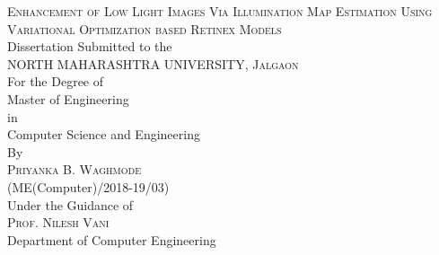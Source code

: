 \begin{titlepage}

\newcommand{\HRule}{\rule{\linewidth}{0.5mm}} %

\center %


\textsc{\normalsize Enhancement of Low Light Images Via Illumination Map Estimation Using Variational Optimization based Retinex Models}\\[1.5cm] %
\normalsize Dissertation Submitted to the\\[0.5cm] %
\textsc{\normalsize NORTH MAHARASHTRA UNIVERSITY, Jalgaon}\\[0.5cm] %
\normalsize For the Degree of\\[0.25cm]
\normalsize Master of Engineering\\[0.5cm]
\normalsize in\\[0.5cm]
\normalsize Computer Science and Engineering\\[0.5cm]
\normalsize By\\[0.5cm]
\textsc{\normalsize Priyanka B. Waghmode}\\[0.25cm]
\normalsize (ME(Computer)/2018-19/03)\\[0.5cm]
\normalsize Under the Guidance of\\
\textsc{\normalsize Prof. Nilesh Vani }\\
\normalsize Department of Computer Engineering






\end{titlepage}
